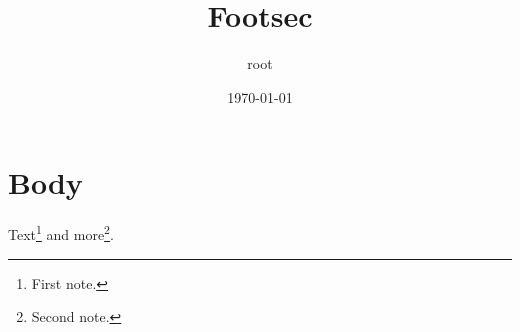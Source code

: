 \documentclass[11pt]{article}
\author{root}
\date{\today}
\title{Footsec}
\begin{document}
\maketitle
\tableofcontents

\section{Body}
\label{sec:orgc587341}
Text\footnote{First note.} and more\footnote{Second note.}.
\end{document}
